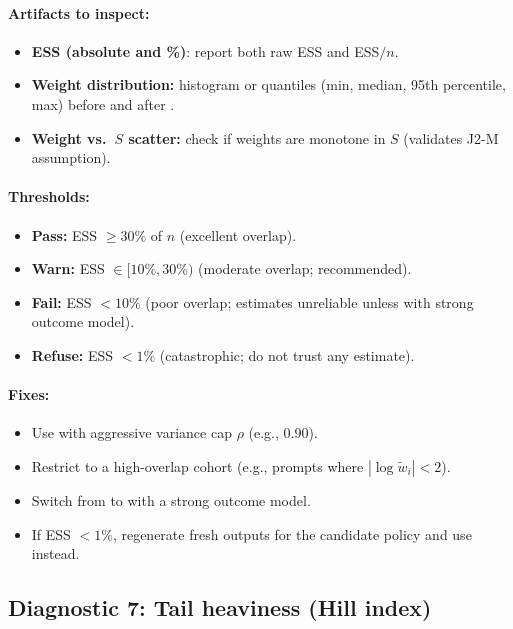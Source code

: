 \begin{enumerate}[resume]
\paragraph{Artifacts to inspect:}
\begin{itemize}
\item \textbf{ESS (absolute and \%)}: report both raw ESS and ESS$/n$.
\item \textbf{Weight distribution:} histogram or quantiles (min, median, 95th percentile, max) before and after \simcal.
\item \textbf{Weight vs.\ $S$ scatter:} check if weights are monotone in $S$ (validates J2-M assumption).
\end{itemize}

\paragraph{Thresholds:}
\begin{itemize}
\item \textbf{Pass:} ESS $\ge 30\%$ of $n$ (excellent overlap).
\item \textbf{Warn:} ESS $\in [10\%, 30\%)$ (moderate overlap; \dr{} recommended).
\item \textbf{Fail:} ESS $< 10\%$ (poor overlap; estimates unreliable unless \dr{} with strong outcome model).
\item \textbf{Refuse:} ESS $< 1\%$ (catastrophic; do not trust any estimate).
\end{itemize}

\paragraph{Fixes:}
\begin{itemize}
\item Use \simcal{} with aggressive variance cap $\rho$ (e.g., 0.90).
\item Restrict to a high-overlap cohort (e.g., prompts where $|\log \tilde{w}_i| < 2$).
\item Switch from \ips{} to \dr{} with a strong outcome model.
\item If ESS $< 1\%$, regenerate fresh outputs for the candidate policy and use \dm{} instead.
\end{itemize}

\subsection{Diagnostic 7: Tail heaviness (Hill index)}


\end{enumerate}
